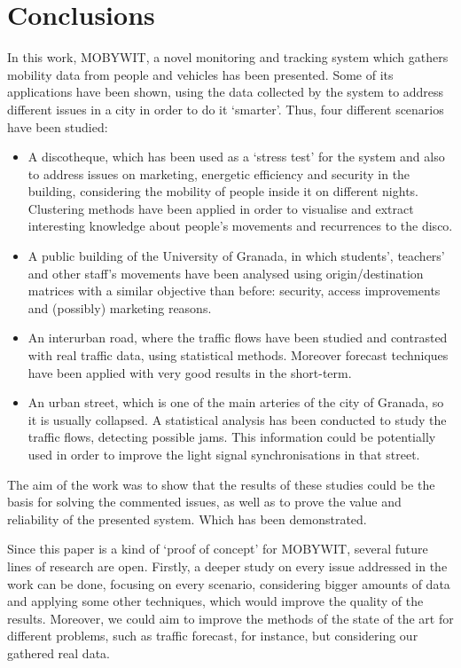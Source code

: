 \documentclass[preprint]{elsarticle}
\begin{document}
\section{Conclusions}
\label{sec:conclusions}

In this work, MOBYWIT, a novel monitoring and tracking system which gathers mobility data from people and vehicles has been presented. Some of its applications have been shown, using the data collected by the system to address different issues in a city in order to do it `smarter'.
Thus, four different scenarios have been studied:

\begin{itemize}
    \item A discotheque, which has been used as a `stress test' for the system and also to address issues on marketing, energetic efficiency and security in the building, considering the mobility of people inside it on different nights. Clustering methods have been applied in order to visualise and extract interesting knowledge about people's movements and recurrences to the disco.
    \item A public building of the University of Granada, in which students', teachers' and other staff's movements have been analysed using origin/destination matrices with a similar objective than before: security, access improvements and (possibly) marketing reasons.
    \item An interurban road, where the traffic flows have been studied and contrasted with real traffic data, using statistical methods. Moreover forecast techniques have been applied with very good results in the short-term.
    \item An urban street, which is one of the main arteries of the city of Granada, so it is usually collapsed. A statistical analysis has been conducted to study the traffic flows, detecting possible jams. This information could be potentially used in order to improve the light signal synchronisations in that street.
\end{itemize}

The aim of the work was to show that the results of these studies could be the basis for solving the commented issues, as well as to prove the value and reliability of the presented system. Which has been demonstrated.

Since this paper is a kind of `proof of concept' for MOBYWIT, several future lines of research are open.
Firstly, a deeper study on every issue addressed in the work can be done, focusing on every scenario, considering bigger amounts of data and applying some other techniques, which would improve the quality of the results. Moreover, we could aim to improve the methods of the state of the art for different problems, such as traffic forecast, for instance, but considering our gathered real data.
\end{document}
